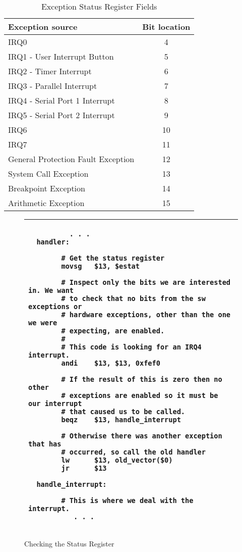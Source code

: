 \begin{table}[h]
\begin{center}
\begin{tabular}{|l|c|}
\hline
\textbf{Exception source} & \textbf{Bit location} \\
\hline
IRQ0 & 4 \\
\hline
IRQ1 - User Interrupt Button & 5 \\
\hline
IRQ2 - Timer Interrupt & 6 \\
\hline
IRQ3 - Parallel Interrupt & 7 \\
\hline
IRQ4 - Serial Port 1 Interrupt & 8 \\
\hline
IRQ5 - Serial Port 2 Interrupt & 9 \\
\hline
IRQ6 & 10 \\
\hline
IRQ7 & 11 \\
\hline
General Protection Fault Exception & 12 \\
\hline
System Call Exception & 13 \\
\hline
Breakpoint Exception & 14 \\
\hline
Arithmetic Exception & 15 \\
\hline
\end{tabular}
\caption{Exception Status Register Fields}
\label{table:sta_loc}
\end{center}
\end{table}

\begin{figure}[h]
\begin{footnotesize}
\begin{center}
\begin{tabular}{|p{10cm}|}
\hline
\begin{verbatim}
          . . .
  handler:

        # Get the status register
        movsg   $13, $estat

        # Inspect only the bits we are interested in. We want
        # to check that no bits from the sw exceptions or
        # hardware exceptions, other than the one we were
        # expecting, are enabled.
        #
        # This code is looking for an IRQ4 interrupt.
        andi    $13, $13, 0xfef0
         
        # If the result of this is zero then no other
        # exceptions are enabled so it must be our interrupt
        # that caused us to be called.
        beqz    $13, handle_interrupt 

        # Otherwise there was another exception that has
        # occurred, so call the old handler
        lw      $13, old_vector($0)
        jr      $13

  handle_interrupt:

        # This is where we deal with the interrupt.
           . . .
\end{verbatim}
\\
\hline
\end{tabular}
\end{center}
\end{footnotesize}
\caption{Checking the Status Register}
\label{code:stat_check}
\end{figure}

